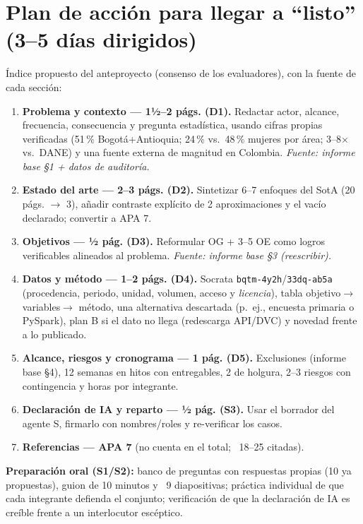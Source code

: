 \section{Plan de acción para llegar a ``listo'' (3--5 días dirigidos)}

Índice propuesto del anteproyecto (consenso de los evaluadores), con la fuente
de cada sección:

\begin{enumerate}
  \item \textbf{Problema y contexto — 1½--2 págs. (D1).} Redactar actor, alcance,
        frecuencia, consecuencia y pregunta estadística, usando cifras propias
        verificadas (51\,\% Bogotá+Antioquia; 24\,\% vs.\ 48\,\% mujeres por
        área; 3--8$\times$ vs.\ DANE) y una fuente externa de magnitud en
        Colombia. \emph{Fuente: informe base \S1 + datos de auditoría.}
  \item \textbf{Estado del arte — 2--3 págs. (D2).} Sintetizar 6--7 enfoques del
        SotA (20 págs. $\rightarrow$ 3), añadir contraste explícito de 2
        aproximaciones y el vacío declarado; convertir a APA 7.
  \item \textbf{Objetivos — ½ pág. (D3).} Reformular OG + 3--5 OE como logros
        verificables alineados al problema. \emph{Fuente: informe base \S3
        (reescribir).}
  \item \textbf{Datos y método — 1--2 págs. (D4).} Socrata
        \texttt{bqtm-4y2h}/\texttt{33dq-ab5a} (procedencia, periodo, unidad,
        volumen, acceso y \emph{licencia}), tabla objetivo$\rightarrow$
        variables$\rightarrow$ método, una alternativa descartada (p.~ej.,
        encuesta primaria o PySpark), plan B si el dato no llega (redescarga
        API/DVC) y novedad frente a lo publicado.
  \item \textbf{Alcance, riesgos y cronograma — 1 pág. (D5).} Exclusiones
        (informe base \S4), 12 semanas en hitos con entregables, 2 de holgura,
        2--3 riesgos con contingencia y horas por integrante.
  \item \textbf{Declaración de IA y reparto — ½ pág. (S3).} Usar el borrador del
        agente S, firmarlo con nombres/roles y re-verificar los casos.
  \item \textbf{Referencias — APA 7} (no cuenta en el total; ~18--25 citadas).
\end{enumerate}

\textbf{Preparación oral (S1/S2):} banco de preguntas con respuestas propias
(10 ya propuestas), guion de 10 minutos y ~9 diapositivas; práctica individual
de que cada integrante defienda el conjunto; verificación de que la declaración
de IA es creíble frente a un interlocutor escéptico.

